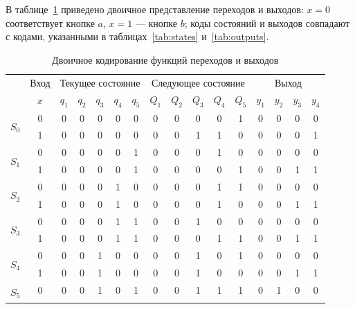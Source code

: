 В таблице~\ref{tab:binary-transition-output} приведено двоичное
представление переходов и выходов: $x=0$ соответствует кнопке $a$,
$x=1$ --- кнопке $b$; коды состояний и выходов совпадают с кодами,
указанными в таблицах~\ref{tab:states} и~\ref{tab:outputs}.

\begin{table}[H]
\centering
\caption{Двоичное кодирование функций переходов и выходов}
\label{tab:binary-transition-output}
\footnotesize
\setlength{\tabcolsep}{7pt}
\renewcommand{\arraystretch}{1.16}
\begin{tabular}{|c|c|c|c|c|c|c|c|c|c|c|c|c|c|c|c|}
\hline
\rowcolor{tableheaderblue}
\multicolumn{1}{|c|}{\cellcolor{tableheaderblue}\multirow{2}{*}{$S$}} & \multicolumn{1}{c|}{\cellcolor{tableheaderblue}Вход} & \multicolumn{5}{c|}{\cellcolor{tableheaderblue}Текущее состояние} & \multicolumn{5}{c|}{\cellcolor{tableheaderblue}Следующее состояние} & \multicolumn{4}{c|}{\cellcolor{tableheaderblue}Выход} \\
\rowcolor{tableheaderblue}
 & $x$ & $q_1$ & $q_2$ & $q_3$ & $q_4$ & $q_5$ & $Q_1$ & $Q_2$ & $Q_3$ & $Q_4$ & $Q_5$ & $y_1$ & $y_2$ & $y_3$ & $y_4$ \\
\hline
\multirow{2}{*}{$S_0$} & 0 & 0 & 0 & 0 & 0 & 0 & 0 & 0 & 0 & 0 & 1 & 0 & 0 & 0 & 0 \\
\cline{2-16}
 & 1 & 0 & 0 & 0 & 0 & 0 & 0 & 0 & 1 & 1 & 0 & 0 & 0 & 0 & 1 \\
\hline
\multirow{2}{*}{$S_1$} & 0 & 0 & 0 & 0 & 0 & 1 & 0 & 0 & 0 & 1 & 0 & 0 & 0 & 0 & 0 \\
\cline{2-16}
 & 1 & 0 & 0 & 0 & 0 & 1 & 0 & 0 & 0 & 0 & 1 & 0 & 0 & 1 & 1 \\
\hline
\multirow{2}{*}{$S_2$} & 0 & 0 & 0 & 0 & 1 & 0 & 0 & 0 & 0 & 1 & 1 & 0 & 0 & 0 & 0 \\
\cline{2-16}
 & 1 & 0 & 0 & 0 & 1 & 0 & 0 & 0 & 0 & 1 & 0 & 0 & 0 & 1 & 1 \\
\hline
\multirow{2}{*}{$S_3$} & 0 & 0 & 0 & 0 & 1 & 1 & 0 & 0 & 1 & 0 & 0 & 0 & 0 & 0 & 0 \\
\cline{2-16}
 & 1 & 0 & 0 & 0 & 1 & 1 & 0 & 0 & 0 & 1 & 1 & 0 & 0 & 1 & 1 \\
\hline
\multirow{2}{*}{$S_4$} & 0 & 0 & 0 & 1 & 0 & 0 & 0 & 0 & 1 & 0 & 1 & 0 & 0 & 0 & 0 \\
\cline{2-16}
 & 1 & 0 & 0 & 1 & 0 & 0 & 0 & 0 & 1 & 0 & 0 & 0 & 0 & 1 & 1 \\
\hline
\multirow{2}{*}{$S_5$} & 0 & 0 & 0 & 1 & 0 & 1 & 0 & 0 & 1 & 1 & 1 & 0 & 1 & 0 & 0 \\
\cline{2-16}

\end{tabular}
\end{table}
